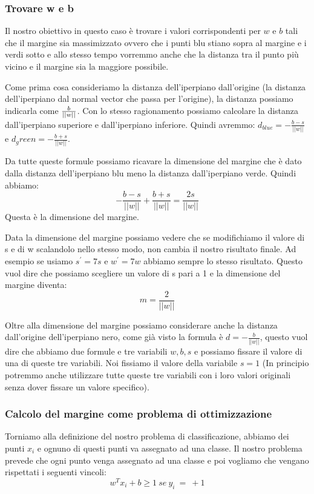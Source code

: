 \documentclass[14pt]{extreport}
\begin{document}
\subsubsection{Trovare w e b}

Il nostro obiettivo in questo caso è trovare i valori corrispondenti per $w$ e $b$ tali che il margine sia massimizzato ovvero che i punti blu stiano
sopra al margine e i verdi sotto e allo stesso tempo vorremmo anche che la distanza tra il punto più vicino e il margine sia la maggiore possibile.

Come prima cosa consideriamo la distanza dell'iperpiano dall'origine (la distanza dell'iperpiano dal normal vector che passa per l'origine), la
distanza possiamo indicarla come $\-\frac{b}{||w||}$. Con lo stesso ragionamento possiamo calcolare la distanza dall'iperpiano superiore e
dall'iperpiano inferiore. Quindi avremmo: $d_{blue} = -\frac{b-s}{||w||}$ e $d_green = -\frac{b+s}{||w||}$.

Da tutte queste formule possiamo ricavare la dimensione del margine che è dato dalla distanza dell'iperpiano blu meno la distanza dall'iperpiano
verde. Quindi abbiamo:
$$-\frac{b-s}{||w||} + \frac{b+s}{||w||} = \frac{2s}{||w||}$$ Questa è la dimensione del margine.

Data la dimensione del margine possiamo vedere che se modifichiamo il valore di s e di w scalandolo nello stesso modo, non cambia il nostro risultato
finale. Ad esempio se usiamo $s^{'}=7s$ e $w^{'} = 7w$ abbiamo sempre lo stesso risultato. Questo vuol dire che possiamo scegliere un valore di s pari
a 1 e la dimensione del margine diventa: $$m = \frac{2}{||w||}$$

Oltre alla dimensione del margine possiamo considerare anche la distanza dall'origine dell'iperpiano nero, come già visto la formula è $d =
-\frac{b}{||w||}$, questo vuol dire che abbiamo due formule e tre variabili $w, b, s$ e possiamo fissare il valore di una di queste tre variabili. Noi
fissiamo il valore della variabile $s=1$ (In principio potremmo anche utilizzare tutte queste tre variabili con i loro valori originali senza dover
fissare un valore specifico).

\subsubsection{Calcolo del margine come problema di ottimizzazione}

Torniamo alla definizione del nostro problema di classificazione, abbiamo dei punti $x_i$ e ognuno di questi punti va assegnato ad una classe. Il
nostro problema prevede che ogni punto venga assegnato ad una classe e poi vogliamo che vengano rispettati i seguenti vincoli: $$w^Tx_i+b \geq 1 \ se\
y_i\ =\ +1$$  
\end{document}
